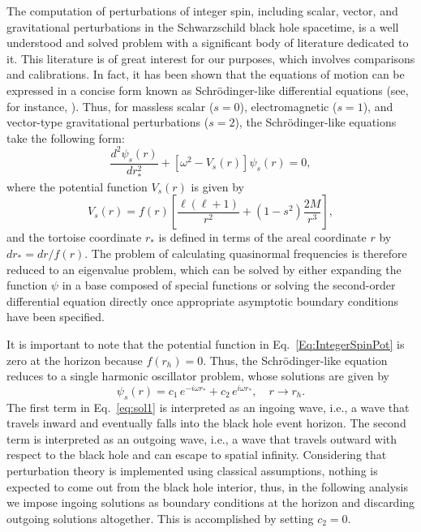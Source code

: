 The computation of perturbations of integer spin, including scalar, vector, and gravitational perturbations in the Schwarzschild black hole spacetime, is a well understood and solved problem with a significant body of literature dedicated to it. This literature is of great interest for our purposes, which involves comparisons and calibrations. In fact, it has been shown that the equations of motion can be expressed in a concise form known as Schrödinger-like differential equations (see, for instance, \cite{review3}). Thus, for massless scalar ($s=0$), electromagnetic ($s=1$), and vector-type gravitational perturbations ($s=2$), the Schrödinger-like equations take the following form:
%
\begin{equation}\label{Eq:IntegerSpin}
  \frac{d^2 \psi_{{s}}(r)}{d r_*^2}
  +\left[\omega^2-V_{{s}}(r)\right]\psi_{{s}}(r)=0,
\end{equation}
%
where the potential function $V_{s}(r)$ is given by
%
\begin{equation}\label{Eq:IntegerSpinPot}
  V_{s}(r)=f(r)\left[\frac{\ell\left(\ell+1\right)}{r^2}
    +\left(1-s^2\right)\frac{2M}{r^3}\right],
\end{equation}
%
and the tortoise coordinate $r_*$ is defined in terms of the areal coordinate $r$ by $dr_*=dr/f(r)$. The problem of calculating quasinormal frequencies is therefore reduced to an eigenvalue problem, which can be solved by either expanding the function $\psi$ in a base composed of special functions or solving the second-order differential equation directly once appropriate asymptotic boundary conditions have been specified.

It is important to note that the potential function in Eq.~\eqref{Eq:IntegerSpinPot} is zero at the horizon because $f(r_h)=0$. Thus, the Schr\"odinger-like equation reduces to a single harmonic oscillator problem, whose solutions are given by
%
\begin{equation}
  \psi_{s}(r)=c_1\, e^{-i\omega r_*}+c_2\, e^{i\omega r_*}, \quad r\to r_h.
  \label{eq:sol1}
\end{equation}
%
The first term in Eq.~\eqref{eq:sol1} is interpreted as an ingoing wave, i.e., a wave that travels inward and eventually falls into the black hole event horizon. The second term is interpreted as an outgoing wave, i.e., a wave that travels outward with respect to the black hole and can escape to spatial infinity. Considering that perturbation theory is implemented using classical assumptions, nothing is expected to come out from the black hole interior, thus, in the following analysis we impose ingoing solutions as boundary conditions at the horizon and discarding outgoing solutions altogether. This is accomplished by setting  $c_2=0$.

